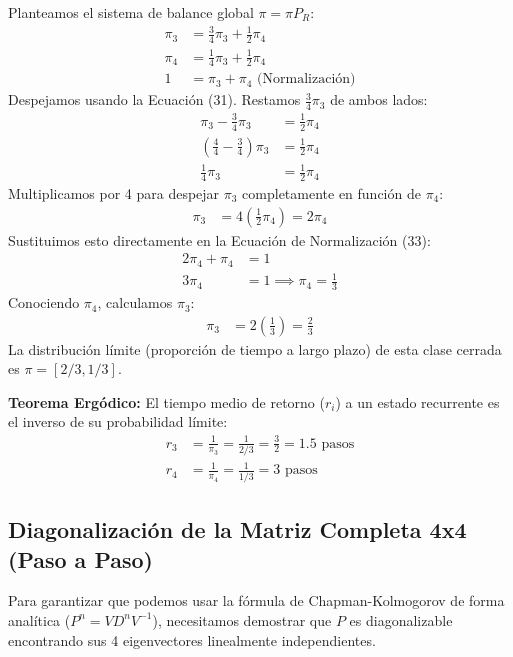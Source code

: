 \documentclass[12pt, a4paper]{article}
\begin{document}
Planteamos el sistema de balance global $\pi = \pi P_R$:
\begin{align}
    \pi_3 &= \frac{3}{4}\pi_3 + \frac{1}{2}\pi_4 \\
    \pi_4 &= \frac{1}{4}\pi_3 + \frac{1}{2}\pi_4 \\
    1 &= \pi_3 + \pi_4 \text{ (Normalización)}
\end{align}
Despejamos usando la Ecuación (31). Restamos $\frac{3}{4}\pi_3$ de ambos lados:
\begin{align*}
    \pi_3 - \frac{3}{4}\pi_3 &= \frac{1}{2}\pi_4 \\
    \left(\frac{4}{4} - \frac{3}{4}\right)\pi_3 &= \frac{1}{2}\pi_4 \\
    \frac{1}{4}\pi_3 &= \frac{1}{2}\pi_4
\end{align*}
Multiplicamos por 4 para despejar $\pi_3$ completamente en función de $\pi_4$:
\begin{align*}
    \pi_3 &= 4 \left(\frac{1}{2}\pi_4\right) = 2\pi_4
\end{align*}
Sustituimos esto directamente en la Ecuación de Normalización (33):
\begin{align*}
    2\pi_4 + \pi_4 &= 1 \\
    3\pi_4 &= 1 \implies \pi_4 = \frac{1}{3}
\end{align*}
Conociendo $\pi_4$, calculamos $\pi_3$:
\begin{align*}
    \pi_3 &= 2 \left(\frac{1}{3}\right) = \frac{2}{3}
\end{align*}
La distribución límite (proporción de tiempo a largo plazo) de esta clase cerrada es $\pi = \left[ 2/3, 1/3 \right]$.

\textbf{Teorema Ergódico:} El tiempo medio de retorno ($r_i$) a un estado recurrente es el inverso de su probabilidad límite:
\begin{align*}
    r_3 &= \frac{1}{\pi_3} = \frac{1}{2/3} = \frac{3}{2} = 1.5 \text{ pasos} \\
    r_4 &= \frac{1}{\pi_4} = \frac{1}{1/3} = 3 \text{ pasos}
\end{align*}

\subsection{Diagonalización de la Matriz Completa 4x4 (Paso a Paso)}
Para garantizar que podemos usar la fórmula de Chapman-Kolmogorov de forma analítica ($P^n = V D^n V^{-1}$), necesitamos demostrar que $P$ es diagonalizable encontrando sus 4 eigenvectores linealmente independientes.
\end{document}
